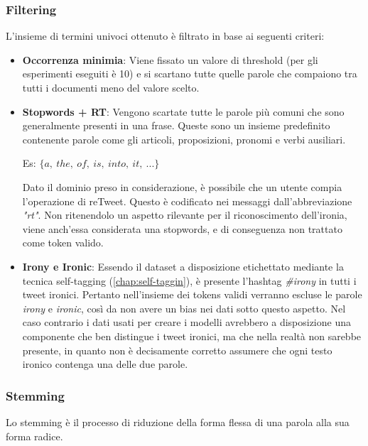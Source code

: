 \documentclass[oneside]{book}
\begin{document}
\subsubsection{Filtering}
\label{section:filtering}
L'insieme di termini univoci ottenuto è filtrato in base ai seguenti criteri:
\begin{itemize}
	\item \textbf{Occorrenza minimia}:
		Viene fissato un valore di threshold (per gli esperimenti eseguiti è 10) e si scartano tutte quelle parole che compaiono tra tutti i documenti meno del valore scelto. 
	\item \textbf{Stopwords + RT}:	
		Vengono scartate tutte le parole più comuni che sono generalmente presenti in una frase. Queste sono un insieme predefinito contenente parole come gli articoli, proposizioni, pronomi e verbi ausiliari.
		
		Es: $\{a,\ the,\ of,\ is,\ into,\ it,\ ...\}$
		
		Dato il dominio preso in considerazione, è possibile che un utente compia l'operazione di reTweet. Questo è codificato nei messaggi dall'abbreviazione \emph{"rt"}. Non ritenendolo un aspetto rilevante per il riconoscimento dell'ironia, viene anch'essa considerata una stopwords, e di conseguenza non trattato come token valido.
	
		
	\item \textbf{Irony e Ironic}:
	Essendo il dataset a disposizione etichettato mediante la tecnica self-tagging (\autoref{chap:self-taggin}), è presente l'hashtag \emph{\#irony} in tutti i tweet ironici. Pertanto nell'insieme dei tokens validi verranno escluse le parole \emph{irony} e \emph{ironic}, così da non avere un bias nei dati sotto questo aspetto. Nel caso contrario i dati usati per creare i modelli avrebbero a disposizione una componente che ben distingue i tweet ironici, ma che nella realtà non sarebbe presente, in quanto non è decisamente corretto assumere che ogni testo ironico contenga una delle due parole.
	
	
\end{itemize}

\subsubsection{Stemming}
Lo stemming è il processo di riduzione della forma flessa di una parola alla sua forma radice.
\end{document}
